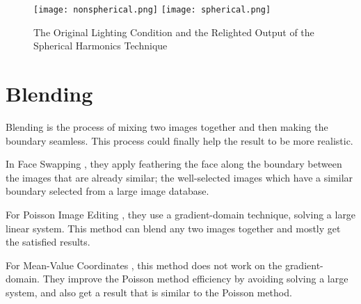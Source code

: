 \begin{figure}[htb]
   \centering
   \texttt{[image: nonspherical.png]}
   \texttt{[image: spherical.png]}
   \caption{The Original Lighting Condition and the Relighted Output of the Spherical Harmonics Technique}
   \label{fig:SphericalHarmonics}
\end{figure}

\section{Blending}
\hspace{0.5in}Blending is the process of mixing two images together and then making the boundary seamless. This process could finally help the result to be more realistic.

In Face Swapping \cite{Bitouk2008}, they apply feathering the face along the boundary between the images that are already similar; the well-selected images which have a similar boundary selected from a large image database.

For Poisson Image Editing \cite{Perez2003}, they use a gradient-domain technique, solving a large linear system. This method can blend any two images together and mostly get the satisfied results.

For Mean-Value Coordinates \cite{Farbman2009}, this method does not work on the gradient-domain. They improve the Poisson method efficiency by avoiding solving a large system, and also get a result that is similar to the Poisson method. 